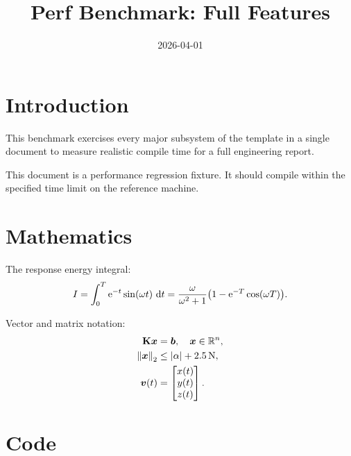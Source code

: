 \documentclass[titlepage=formal,code=listings]{SUSTechHomework}
\title{Perf Benchmark: Full Features}
\date{2026-04-01}
\begin{document}
\clearauthors
{}

\maketitle
\tableofcontents

\section{Introduction}

This benchmark exercises every major subsystem of the template in a single
document to measure realistic compile time for a full engineering report.

\begin{sustechnote}[title=Benchmark Note]
This document is a performance regression fixture. It should compile within
the specified time limit on the reference machine.
\end{sustechnote}

\section{Mathematics}

The response energy integral:
\[
  I = \int_{0}^{T} \e^{-t} \sin(\omega t)\,\diff t
  = \frac{\omega}{\omega^{2}+1}\bigl(1 - \e^{-T}\cos(\omega T)\bigr).
\]

Vector and matrix notation:
\begin{align}
  \mat{K}\vect{x} &= \vect{b}, \quad \vect{x} \in \mathbb{R}^{n}, \\
  \norm*{\vect{x}}_2 &\le \abs*{\alpha} + \qty{2.5}{\newton}, \\
  \vect{v}(t) &= \begin{bmatrix} x(t) \\ y(t) \\ z(t) \end{bmatrix}.
\end{align}

\section{Code}
\end{document}

